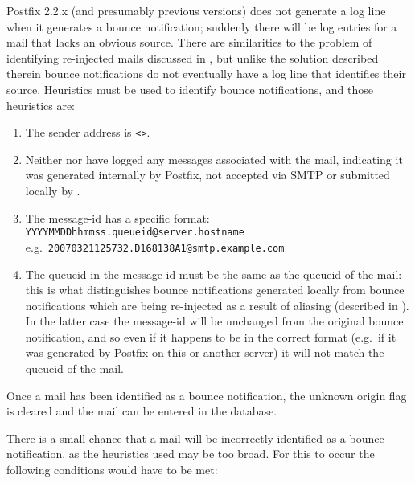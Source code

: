 Postfix 2.2.x (and presumably previous versions) does not generate a log
line when it generates a bounce notification; suddenly there will be log
entries for a mail that lacks an obvious source.  There are similarities to
the problem of identifying re-injected mails discussed in
, but unlike the solution described
therein bounce notifications do not eventually have a log line that
identifies their source.  Heuristics must be used to identify bounce
notifications, and those heuristics are:

\begin{enumerate}

    \item The sender address is \verb!<>!.\glsadd{<>}

    \item Neither  nor  have logged any
        messages associated with the mail, indicating it was generated
        internally by Postfix, not accepted via \gls{SMTP} or submitted
        locally by .

    \item The message-id has a specific format: \newline{}
        \tab{} \texttt{YYYYMMDDhhmmss.queueid@server.hostname} \newline{}
        e.g.\ \texttt{20070321125732.D168138A1@smtp.example.com}

    \item The queueid in the message-id must be the same as the queueid of
        the mail: this is what distinguishes bounce notifications generated
        locally from bounce notifications which are being re-injected as a
        result of aliasing (described in ).
        In the latter case the message-id will be unchanged from the
        original bounce notification, and so even if it happens to be in
        the correct format (e.g.\ if it was generated by Postfix on this or
        another server) it will not match the queueid of the mail.

\end{enumerate}

Once a mail has been identified as a bounce notification, the unknown
origin flag is cleared and the mail can be entered in the database.

There is a small chance that a mail will be incorrectly identified as a
bounce notification, as the heuristics used may be too broad.  For this to
occur the following conditions would have to be met:


